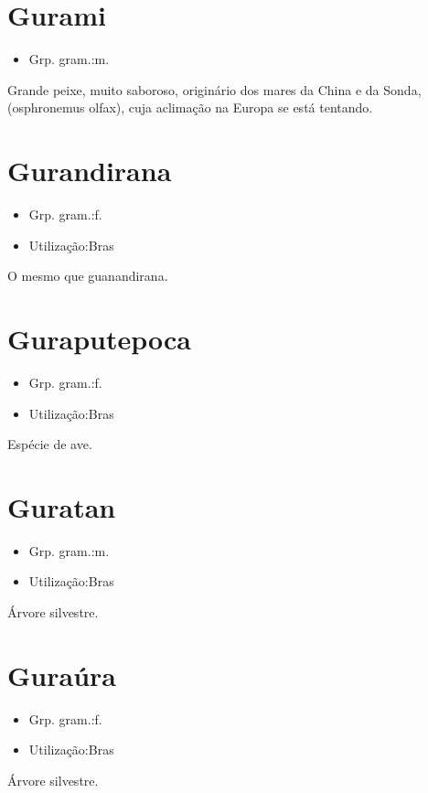 \section{Gurami}
\begin{itemize}
\item {Grp. gram.:m.}
\end{itemize}
Grande peixe, muito saboroso, originário dos mares da China e da Sonda, (\textunderscore osphronemus olfax\textunderscore ), cuja aclimação na Europa se está tentando.
\section{Gurandirana}
\begin{itemize}
\item {Grp. gram.:f.}
\end{itemize}
\begin{itemize}
\item {Utilização:Bras}
\end{itemize}
O mesmo que \textunderscore guanandirana\textunderscore .
\section{Guraputepoca}
\begin{itemize}
\item {Grp. gram.:f.}
\end{itemize}
\begin{itemize}
\item {Utilização:Bras}
\end{itemize}
Espécie de ave.
\section{Guratan}
\begin{itemize}
\item {Grp. gram.:m.}
\end{itemize}
\begin{itemize}
\item {Utilização:Bras}
\end{itemize}
Árvore silvestre.
\section{Guraúra}
\begin{itemize}
\item {Grp. gram.:f.}
\end{itemize}
\begin{itemize}
\item {Utilização:Bras}
\end{itemize}
Árvore silvestre.
